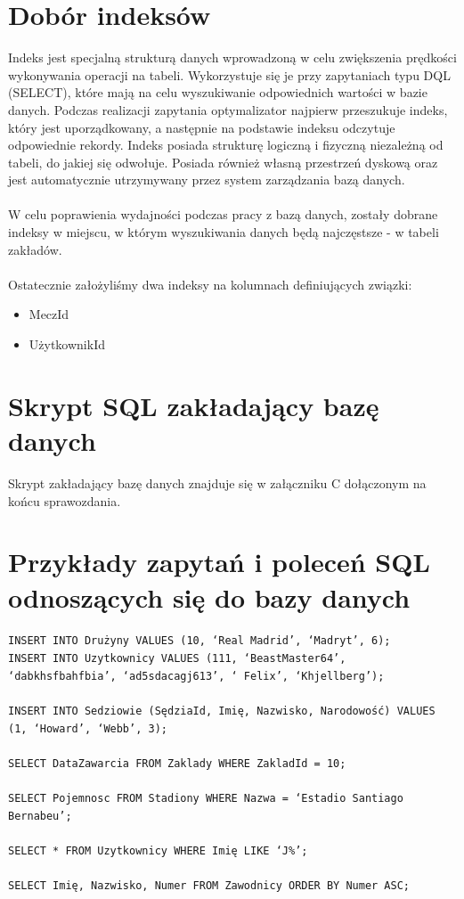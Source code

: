 \documentclass{mwrep}
\begin{document}
\section{Dobór indeksów}
Indeks jest specjalną strukturą danych wprowadzoną w celu 
zwiększenia prędkości wykonywania operacji na tabeli.
Wykorzystuje się je przy zapytaniach typu DQL (SELECT), które mają na celu wyszukiwanie
odpowiednich wartości w bazie danych. Podczas realizacji zapytania optymalizator
najpierw przeszukuje indeks, który jest uporządkowany, a następnie na podstawie indeksu 
odczytuje odpowiednie rekordy. Indeks posiada strukturę logiczną i fizyczną niezależną od 
tabeli, do jakiej się odwołuje. Posiada również własną przestrzeń dyskową oraz jest automatycznie 
utrzymywany przez system zarządzania bazą danych\cite{msdn}.
\\
\\
\indent W celu poprawienia wydajności podczas pracy z bazą danych, 
zostały dobrane indeksy w miejscu, w którym wyszukiwania danych będą najczęstsze - w tabeli zakładów.
\\ \\
Ostatecznie założyliśmy dwa indeksy na kolumnach definiujących związki:
\begin{itemize}
	\item MeczId
	\item UżytkownikId
\end{itemize}

\section{Skrypt SQL zakładający bazę danych}
Skrypt zakładający bazę danych znajduje się w załączniku C dołączonym na końcu sprawozdania.

\section{Przykłady zapytań i poleceń SQL odnoszących się do bazy danych}

\texttt{INSERT INTO Drużyny VALUES (10, ‘Real Madrid’, ‘Madryt’, 6); }\\

\texttt{INSERT INTO Uzytkownicy VALUES (111, ‘BeastMaster64’, ‘dabkhsfbahfbia’, ‘ad5sdacagj613’, ‘ Felix’, ‘Khjellberg’); }
\\ \\
\texttt{INSERT INTO  Sedziowie  (SędziaId, Imię, Nazwisko, Narodowość) VALUES (1, ‘Howard’, ‘Webb’, 3); }
\\ \\
\texttt{SELECT DataZawarcia FROM Zaklady WHERE ZakladId = 10; }
\\ \\
\texttt{SELECT Pojemnosc FROM Stadiony WHERE Nazwa = ‘Estadio Santiago Bernabeu’;}
\\ \\
\texttt{SELECT * FROM Uzytkownicy WHERE Imię LIKE ‘J\%’; }
\\ \\
\texttt{SELECT Imię, Nazwisko, Numer FROM Zawodnicy ORDER BY Numer ASC; }
\\ \\
\end{document}
